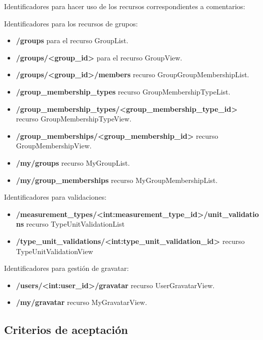 Identificadores para hacer uso de los recursos correspondientes a comentarios:

Identificadores para los recursos de grupos:
\begin{itemize}
	\item \textbf{/groups} para el recurso GroupList.
	\item \textbf{/groups/<group\_id>} para el recurso GroupView.
	\item \textbf{/groups/<group\_id>/members} recurso GroupGroupMembershipList.
	\item \textbf{/group\_membership\_types} recurso GroupMembershipTypeList.
	\item \textbf{/group\_membership\_types/<group\_membership\_type\_id>} recurso GroupMembershipTypeView.
	\item \textbf{/group\_memberships/<group\_membership\_id>} recurso GroupMembershipView.
	\item \textbf{/my/groups} recurso MyGroupList.
	\item \textbf{/my/group\_memberships} recurso MyGroupMembershipList.
\end{itemize}

Identificadores para validaciones:

\begin{itemize}
	\item \textbf{/measurement\_types/<int:measurement\_type\_id>/unit\_validations} recurso TypeUnitValidationList
	\item \textbf{/type\_unit\_validations/<int:type\_unit\_validation\_id>} recurso TypeUnitValidationView 
\end{itemize}

Identificadores para gestión de gravatar:

\begin{itemize}
	\item \textbf{/users/<int:user\_id>/gravatar} recurso UserGravatarView.
	\item \textbf{/my/gravatar} recurso MyGravatarView.
\end{itemize}

\subsection{Criterios de aceptación}

